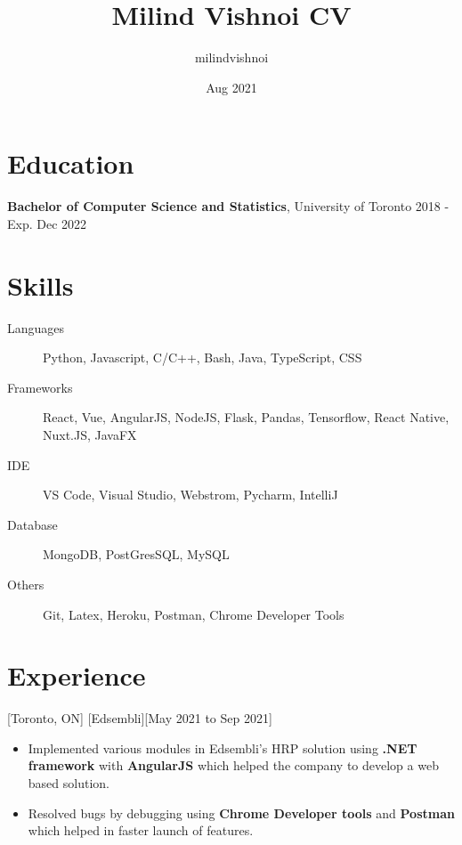 \documentclass{article}
\title{Milind Vishnoi CV}
\author{milindvishnoi}
\date{Aug 2021}
\begin{document}

\makecvtitle %
 
 
 
\section{Education}
{\bf Bachelor of Computer Science and Statistics}, University of Toronto \hfill {2018 - Exp. Dec 2022}



\section{Skills}
\begin{description}
\item [Languages] Python, Javascript, C/C++, Bash, Java, TypeScript, CSS
\item [Frameworks] React, Vue, AngularJS, NodeJS, Flask, Pandas, Tensorflow, React Native, Nuxt.JS, JavaFX
\item [IDE] VS Code, Visual Studio, Webstrom, Pycharm, IntelliJ
\item [Database] MongoDB, PostGresSQL, MySQL
\item [Others] Git, Latex, Heroku, Postman, Chrome Developer Tools
\end{description}

 
 
\section{Experience}

[Toronto, ON]
[Edsembli][May 2021 to Sep 2021]
 \begin{itemize}
     \item Implemented various modules in Edsembli’s HRP solution using \textbf{.NET framework} with \textbf{AngularJS} which helped the company to develop a web based solution.
     \item Resolved bugs by debugging using \textbf{Chrome Developer tools} and \textbf{Postman} which helped in faster launch of features.
 \end{itemize}
\end{document}
